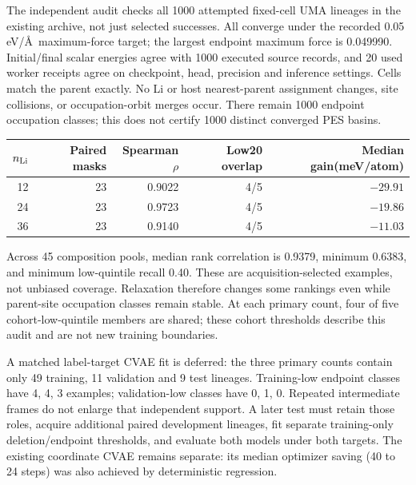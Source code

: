 The independent audit checks all 1000 attempted fixed-cell UMA lineages in the
existing archive, not just selected successes. All converge under the recorded
0.05 eV/\AA\ maximum-force target; the largest endpoint maximum force is 0.049990.
Initial/final scalar energies agree with 1000 executed source records, and 20
used worker receipts agree on checkpoint, head, precision and inference settings.
Cells match the parent exactly. No Li or host nearest-parent assignment changes,
site collisions, or occupation-orbit merges occur. There remain 1000 endpoint
occupation classes; this does not certify 1000 distinct converged PES basins.

\begin{center}\small
\begin{tabular}{rrrrr}
\toprule
$n_{\rm Li}$ & Paired masks & Spearman$\rho$ & Low20 overlap & Median gain(meV/atom)\\
\midrule
12&23&0.9022&4/5&$-29.91$\\
24&23&0.9723&4/5&$-19.86$\\
36&23&0.9140&4/5&$-11.03$\\
\bottomrule
\end{tabular}
\end{center}
Across 45 composition pools, median rank correlation is 0.9379, minimum 0.6383,
and minimum low-quintile recall 0.40. These are acquisition-selected examples,
not unbiased coverage. Relaxation therefore changes some rankings even while
parent-site occupation classes remain stable. At each primary count, four of
five cohort-low-quintile members are shared; these cohort thresholds describe
this audit and are not new training boundaries.

A matched label-target CVAE fit is deferred: the three primary counts contain
only 49 training, 11 validation and 9 test lineages. Training-low endpoint classes
have 4, 4, 3 examples; validation-low classes have 0, 1, 0. Repeated intermediate
frames do not enlarge that independent support. A later test must retain those
roles, acquire additional paired development lineages, fit separate training-only
deletion/endpoint thresholds, and evaluate both models under both targets.
The existing coordinate CVAE remains separate: its median optimizer saving
(40 to 24 steps) was also achieved by deterministic regression.
